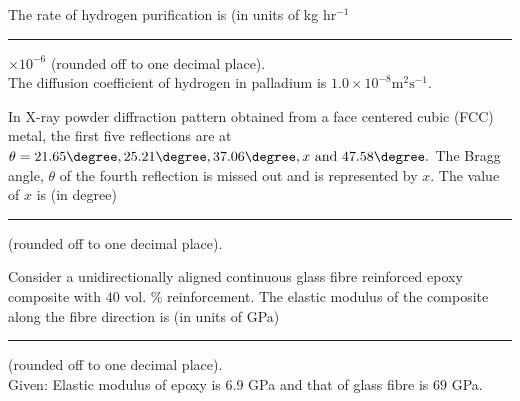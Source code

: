 The rate of hydrogen purification is (in units of kg  hr$^{-1}$ \rule{1cm}{0.4 pt} $\times 10^{-6}$ (rounded off to one decimal place).\\
The diffusion coefficient of hydrogen in palladium is $1.0 \times 10^{-8} \text{m}^2 \text{s}^{-1}$.

\item In X-ray powder diffraction pattern obtained from a face centered cubic (FCC) metal, the first five reflections are at $\theta = 21.65\degree, 25.21\degree, 37.06\degree , x\text{ and } 47.58\degree.$ The
Bragg angle, $\theta$ of the fourth reflection is missed out and is represented by $x$. The
value of $x$ is (in degree) \rule{1cm}{0.4 pt} (rounded off to one decimal place). 

\item Consider a unidirectionally aligned continuous glass fibre reinforced epoxy
composite with $40$ vol. \%  reinforcement. The elastic modulus of the composite along the fibre direction is (in units of GPa) \rule{1cm}{0.4 pt} (rounded off to one decimal place).\\
Given: Elastic modulus of epoxy is $6.9$ GPa and that of glass fibre is $69$ GPa. 




